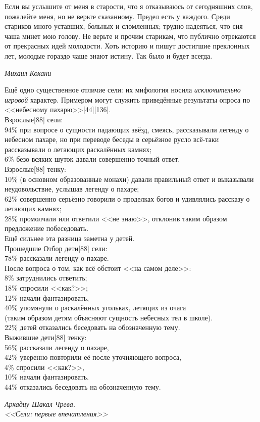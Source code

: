 \documentclass[a4paper,10pt]{book}
\begin{document}
\epigraph{Если вы услышите от меня в старости, что я отказываюсь от сегодняшних 
слов, пожалейте меня, но не верьте сказанному. Предел есть у каждого. Среди 
стариков много уставших, больных и сломленных; трудно надеяться, что сия чаша 
минет мою голову. Не верьте и прочим старикам, что публично отрекаются от 
прекрасных идей молодости. Хоть историю и пишут достигшие преклонных лет, 
молодые гораздо чаще знают истину. Так было и будет всегда.}
{\textit{Михаил Кохани}}

\epigraph{Ещё одно существенное отличие сели: их мифология носила 
\textit{исключительно игровой} характер. Примером могут служить приведённые 
результаты опроса по <<небесному пахарю>>[44][136].\\
Взрослые[88] сели:\\
94\% при вопросе о сущности падающих звёзд, смеясь, рассказывали легенду о 
небесном пахаре, но при переводе беседы в серьёзное русло всё-таки рассказывали 
о летающих раскалённых камнях;\\
6\% безо всяких шуток давали совершенно точный ответ.\\
Взрослые[88] тенку:\\
10\% (в основном образованные монахи) давали правильный ответ и выказывали 
неудовольствие, услышав легенду о пахаре;\\
62\% совершенно серьёзно говорили о проделках богов и удивлялись рассказу о 
летающих камнях;\\
28\% промолчали или ответили <<не знаю>>, отклонив таким образом предложение 
побеседовать.\\
Ещё сильнее эта разница заметна у детей.\\ 
Прошедшие Отбор дети[88] сели:\\
78\% рассказали легенду о пахаре.\\
После вопроса о том, как всё обстоит <<на самом деле>>:\\ 
8\% затруднились ответить;\\
18\% спросили <<как?>>;\\
12\% начали фантазировать,\\
40\% упомянули о раскалённых угольках, летящих из очага\\
(таким образом детям объясняют сущность небесных тел в школе).\\
22\% детей отказались беседовать на обозначенную тему.\\
Выжившие дети[88] тенку:\\
56\% рассказали легенду о пахаре,\\
42\% уверенно повторили её после уточняющего вопроса,\\
4\% спросили <<как?>>,\\
10\% начали фантазировать.\\
44\% отказались беседовать на обозначенную тему.}
{\textit{Аркадиу Шакал Чрева.\\<<Сели: первые впечатления>>}}
\end{document}
